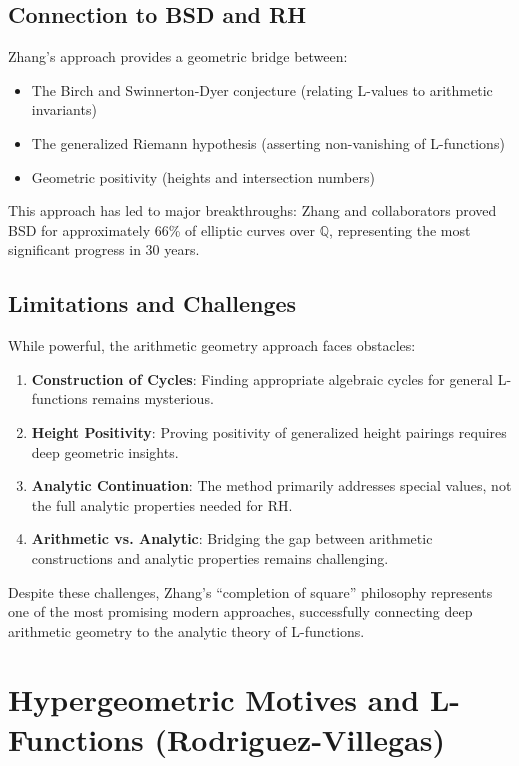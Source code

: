 \subsection{Connection to BSD and RH}

Zhang's approach provides a geometric bridge between:
\begin{itemize}
\item The Birch and Swinnerton-Dyer conjecture (relating L-values to arithmetic invariants)
\item The generalized Riemann hypothesis (asserting non-vanishing of L-functions)
\item Geometric positivity (heights and intersection numbers)
\end{itemize}

\begin{remark}
This approach has led to major breakthroughs: Zhang and collaborators proved BSD for approximately 66\% of elliptic curves over $\mathbb{Q}$, representing the most significant progress in 30 years.
\end{remark}

\subsection{Limitations and Challenges}

While powerful, the arithmetic geometry approach faces obstacles:

\begin{enumerate}
\item \textbf{Construction of Cycles}: Finding appropriate algebraic cycles for general L-functions remains mysterious.
\item \textbf{Height Positivity}: Proving positivity of generalized height pairings requires deep geometric insights.
\item \textbf{Analytic Continuation}: The method primarily addresses special values, not the full analytic properties needed for RH.
\item \textbf{Arithmetic vs. Analytic}: Bridging the gap between arithmetic constructions and analytic properties remains challenging.
\end{enumerate}

Despite these challenges, Zhang's ``completion of square'' philosophy represents one of the most promising modern approaches, successfully connecting deep arithmetic geometry to the analytic theory of L-functions.

\section{Hypergeometric Motives and L-Functions (Rodriguez-Villegas)}
\label{sec:hypergeometric_motives}

